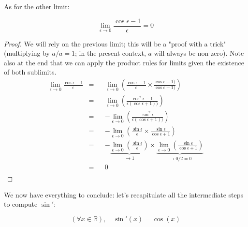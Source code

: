 \documentclass[solutions.tex]{subfiles}
\begin{document}
As for the other limit:
\begin{theorem}
\[
	\boxed{\lim_{\epsilon\rightarrow 0} \frac{\cos\epsilon-1}{\epsilon} = 0}
\]
\end{theorem}
\begin{proof} We will rely on the previous limit; this will be a "proof
with a trick" (multiplying by $a/a=1$; in the present context, $a$ will
always be non-zero). Note also at the end that we can
apply the product rules for limits given the existence of both sublimits.
\begin{equation*} \begin{aligned}
	\lim_{\epsilon\rightarrow 0} \frac{\cos\epsilon-1}{\epsilon}
		&=&& \lim_{\epsilon\rightarrow 0}\left(
			\frac{\cos\epsilon-1}{\epsilon}
			\times\frac{\cos\epsilon+1)}{\cos\epsilon+1)}
		\right) \\
	~ &=&& \lim_{\epsilon\rightarrow 0}\left(
			\frac{\cos^2\epsilon-1}{\epsilon(\cos\epsilon+1))}
		\right) \\
	~ &=&& -\lim_{\epsilon\rightarrow 0}\left(
			\frac{\sin^2\epsilon}{\epsilon(\cos\epsilon+1))}
		\right) \\
	~ &=&& -\lim_{\epsilon\rightarrow 0}\left(
			\frac{\sin\epsilon}{\epsilon}\times\frac{\sin\epsilon}{\cos\epsilon+1}
		\right) \\
	~ &=&& -\underbrace{\lim_{\epsilon\rightarrow 0}(
			\frac{\sin\epsilon}{\epsilon})}_{\rightarrow 1}
		\times\underbrace{
			\lim_{\epsilon\rightarrow 0}(\frac{\sin\epsilon}{\cos\epsilon+1})
		}_{\rightarrow 0/2=0} \\
	~ &=&& \boxed{0} \\
\end{aligned} \end{equation*}
\end{proof}

We now have everything to conclude: let's recapitulate all the
intermediate steps to compute $\sin'$:
\begin{theorem}
\[
	(\forall x\in\mathbb{R}),\quad \boxed{\sin'(x) = \cos(x)}
\]
\end{theorem}
\end{document}
